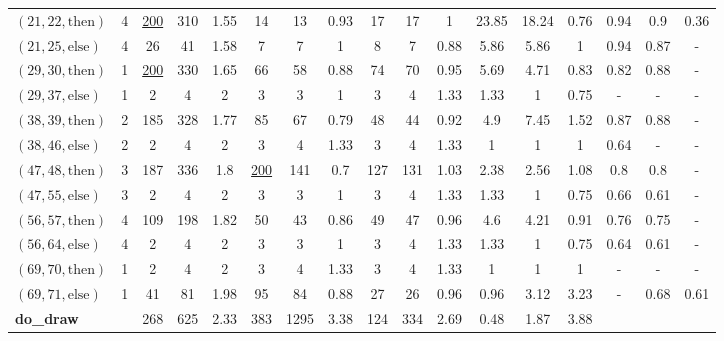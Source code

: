 \documentclass[sigconf]{acmart}
\newcommand{\thenBr}{\text{then}}
\newcommand{\elseBr}{\text{else}}
\newcommand{\un}[1]{\underline{#1}}
\begin{document}
\begin{table}[!t]
\begin{tabular}{lc|ccc|ccc|ccc|ccc|ccc}
    $(21,22,\thenBr)$ & 4        & \un{200} & 310  & 1.55      & 14   & 13  & 0.93          & 17  & 17  & 1                & 23.85  & 18.24 & 0.76   & 0.94 & 0.9  & 0.36  \\
    $(21,25,\elseBr)$ & 4        & 26       & 41   & 1.58      & 7    & 7   & 1             & 8   & 7   & 0.88             & 5.86   & 5.86  & 1      & 0.94 & 0.87 & -  \\
    $(29,30,\thenBr)$ & 1        & \un{200} & 330  & 1.65      & 66   & 58  & 0.88          & 74  & 70  & 0.95             & 5.69   & 4.71  & 0.83   & 0.82 & 0.88 & -   \\
    $(29,37,\elseBr)$ & 1        & 2        & 4    & 2         & 3    & 3   & 1             & 3   & 4   & 1.33             & 1.33   & 1     & 0.75   & - & - & -  \\
    $(38,39,\thenBr)$ & 2        & 185      & 328  & 1.77      & 85   & 67  & 0.79          & 48  & 44  & 0.92             & 4.9    & 7.45  & 1.52   & 0.87 & 0.88 & -  \\
    $(38,46,\elseBr)$ & 2        & 2        & 4    & 2         & 3    & 4   & 1.33          & 3   & 4   & 1.33             & 1      & 1     & 1      & 0.64 & - & -  \\
    $(47,48,\thenBr)$ & 3        & 187      & 336  & 1.8       & \un{200} & 141 & 0.7       & 127 & 131 & 1.03             & 2.38   & 2.56  & 1.08   & 0.8  & 0.8  & -  \\
    $(47,55,\elseBr)$ & 3        & 2        & 4    & 2         & 3    & 3   & 1             & 3   & 4   & 1.33             & 1.33   & 1     & 0.75   & 0.66 & 0.61 & -  \\
    $(56,57,\thenBr)$ & 4        & 109      & 198  & 1.82      & 50   & 43  & 0.86          & 49  & 47  & 0.96             & 4.6    & 4.21  & 0.91   & 0.76 & 0.75 & -   \\
    $(56,64,\elseBr)$ & 4        & 2        & 4    & 2         & 3    & 3   & 1             & 3   & 4   & 1.33             & 1.33   & 1     & 0.75   & 0.64 & 0.61 & -  \\
    $(69,70,\thenBr)$ & 1        & 2        & 4    & 2         & 3    & 4   & 1.33          & 3   & 4   & 1.33             & 1      & 1     & 1      & - & - & -  \\
    $(69,71,\elseBr)$ & 1        & 41       & 81   & 1.98      & 95   & 84  & 0.88          & 27  & 26  & 0.96             & 0.96   & 3.12  & 3.23   & - & 0.68 & 0.61  \\
    \toprule
    \multicolumn{2}{l|}{\textbf{do\_draw}}       
                                 & 268      & 625  & 2.33      & 383  & 1295 & 3.38         & 124 & 334 & 2.69             & 0.48   & 1.87  & 3.88   &      &      &       \\

\end{tabular}
\end{table}
\end{document}
